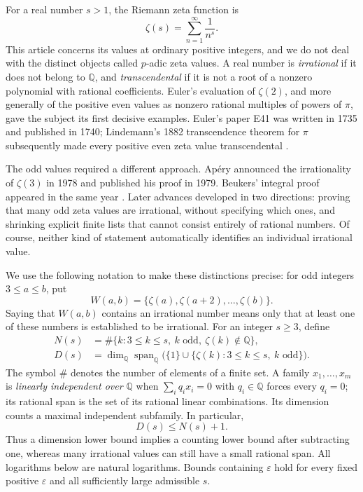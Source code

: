 \documentclass[11pt,letterpaper]{article}
\theoremstyle{definition}
\newcommand{\Q}{\mathbb Q}
\begin{document}
For a real number $s>1$, the Riemann zeta function is
\[
  \zeta(s)=\sum_{n=1}^{\infty}\frac{1}{n^s}.
\]
This article concerns its values at ordinary positive integers, and we do not deal with the distinct objects called $p$-adic zeta values.
A real number is \emph{irrational} if it does not belong to $\Q$, and
\emph{transcendental} if it is not a root of a nonzero polynomial with rational
coefficients.  Euler's evaluation of $\zeta(2)$, and more generally of the
positive even values as nonzero rational multiples of powers of $\pi$, gave
the subject its first decisive examples.  Euler's paper E41 was written in
1735 and published in 1740; Lindemann's 1882 transcendence theorem for $\pi$
subsequently made every positive even zeta value transcendental
\cite{euler1740,lindemann1882,dlmf}.

The odd values required a different approach.  Ap\'ery announced the
irrationality of $\zeta(3)$ in 1978 and published his proof in 1979.
Beukers' integral proof appeared in the same year
\cite{apery1979,beukers1979}.  Later advances developed in two directions:
proving that many odd zeta values are irrational, without specifying which
ones, and shrinking explicit finite lists that cannot consist entirely of
rational numbers.  Of course, neither kind of statement automatically identifies an
individual irrational value.

We use the following notation to make these distinctions precise: for odd integers
$3\leq a\leq b$, put
\[
 W(a,b)=\{\zeta(a),\zeta(a+2),\ldots,\zeta(b)\}.
\]
Saying that $W(a,b)$ contains an irrational number means only that at least one
of these numbers is established to be irrational.
For an integer $s\geq3$, define
\begin{align*}
 N(s)&=\#\{k:3\leq k\leq s,\ k\text{ odd},\ \zeta(k)\notin\Q\},\\
 D(s)&=\dim_{\Q}\operatorname{span}_{\Q}
       \bigl(\{1\}\cup\{\zeta(k):3\leq k\leq s,\ k\text{ odd}\}\bigr).
\end{align*}
The symbol $\#$ denotes the number of elements of a finite set.  A family
$x_1,\ldots,x_m$ is \emph{linearly independent over $\Q$} when
$\sum_i q_i x_i=0$ with $q_i\in\Q$ forces every $q_i=0$; its rational span
is the set of its rational linear combinations.  Its dimension counts a
maximal independent subfamily.  In particular,
\[
                    D(s)\leq N(s)+1.
\]
Thus a dimension lower bound implies a counting lower bound after
subtracting one, whereas many irrational values can still have a small
rational span.  All logarithms below are natural logarithms.  Bounds
containing $\varepsilon$ hold for every fixed positive $\varepsilon$ and
all sufficiently large admissible $s$.
\end{document}

